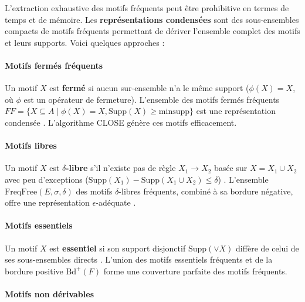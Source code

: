 \documentclass[a4paper,14pt]{article}
\begin{document}
        \label{sec:rep_condensees}
        
        L’extraction exhaustive des motifs fréquents peut être prohibitive en termes de temps et de mémoire. Les \textbf{représentations condensées} sont des sous-ensembles compacts de motifs fréquents permettant de dériver l’ensemble complet des motifs et leurs supports. Voici quelques approches :
        
        \paragraph{Motifs fermés fréquents}
        
        Un motif \( X \) est \textbf{fermé} si aucun sur-ensemble n’a le même support (\( \phi(X) = X \), où \( \phi \) est un opérateur de fermeture). L’ensemble des motifs fermés fréquents \( FF = \{X \subseteq A \mid \phi(X) = X, \text{Supp}(X) \geq \text{minsupp}\} \) est une représentation condensée \cite{PBTL99a}. L’algorithme CLOSE génère ces motifs efficacement.
        
        \paragraph{Motifs libres}
        
        Un motif \( X \) est \textbf{\( \delta \)-libre} s’il n’existe pas de règle \( X_1 \rightarrow X_2 \) basée sur \( X = X_1 \cup X_2 \) avec peu d’exceptions (\( \text{Supp}(X_1) - \text{Supp}(X_1 \cup X_2) \leq \delta \)) \cite{BB00}. L’ensemble \( \text{FreqFree}(E, \sigma, \delta) \) des motifs \( \delta \)-libres fréquents, combiné à sa bordure négative, offre une représentation \( \epsilon \)-adéquate \cite{BBR03}.
        
        \paragraph{Motifs essentiels}
        
        Un motif \( X \) est \textbf{essentiel} si son support disjonctif \( \text{Supp}(\vee X) \) diffère de celui de ses sous-ensembles directs \cite{CCL05}. L’union des motifs essentiels fréquents et de la bordure positive \( \text{Bd}^+(F) \) forme une couverture parfaite des motifs fréquents.
        
        \paragraph{Motifs non dérivables}
        
\end{document}

